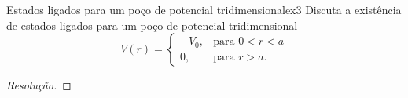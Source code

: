 \begin{exercício}{Estados ligados para um poço de potencial tridimensional}{ex3}
    Discuta a existência de estados ligados para um poço de potencial tridimensional
    \begin{equation*}
        V(r) = \begin{cases}
            -V_0, & \text{para } 0 < r < a\\
            0,& \text{para } r > a.
        \end{cases}
    \end{equation*}
\end{exercício}
\begin{proof}[Resolução]
    
\end{proof}
